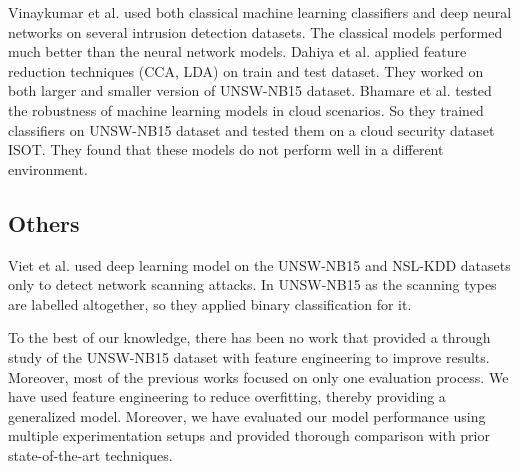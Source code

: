 \documentclass[14pt, conference]{IEEEtran}
\begin{document}
Vinaykumar et al. \cite{vinayakumar2019deep} used both classical machine learning classifiers and deep neural networks on several intrusion detection datasets. The classical models performed much better than the neural network models.
Dahiya et al. \cite{dahiya2018network} applied feature reduction techniques (CCA, LDA) on train and test dataset. They worked on both larger and smaller version of UNSW-NB15 dataset. Bhamare et al. \cite{bhamare2016feasibility} tested the robustness of machine learning models in cloud scenarios. So they trained classifiers on UNSW-NB15 dataset and tested them on a cloud security dataset ISOT. They found that these models do not perform well in a different environment.

\subsection{Others}
Viet et al. \cite{viet2018using} used deep learning model on the UNSW-NB15 and NSL-KDD datasets only to detect network scanning attacks. In UNSW-NB15 as the scanning types are
labelled altogether, so they applied binary classification for it.

To the best of our knowledge, there has been no work that  provided a through study of the UNSW-NB15 dataset with feature engineering to improve results. Moreover, most of the previous works focused on only one evaluation process.
We have used feature engineering to reduce overfitting, thereby  providing a generalized model. Moreover, we have evaluated our model performance using multiple experimentation setups and provided thorough comparison with prior state-of-the-art techniques.
\end{document}
